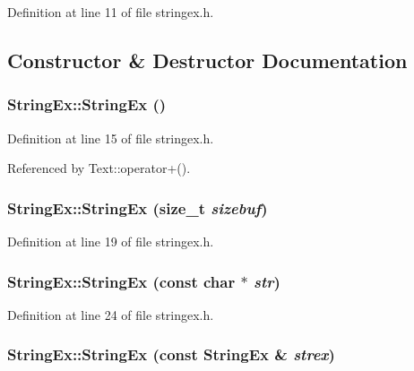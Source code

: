 Definition at line 11 of file stringex.h.

\subsection{Constructor \& Destructor Documentation}
\hypertarget{classStringEx_682cb42c740bb422cc430533b57a92cf}{
\subsubsection[{StringEx}]{\setlength{\rightskip}{0pt plus 5cm}StringEx::StringEx ()}}
\label{classStringEx_682cb42c740bb422cc430533b57a92cf}




Definition at line 15 of file stringex.h.

Referenced by Text::operator+().\hypertarget{classStringEx_949af3bd05202d94d9550fc5da749aba}{
\subsubsection[{StringEx}]{\setlength{\rightskip}{0pt plus 5cm}StringEx::StringEx (size\_\-t {\em sizebuf})}}
\label{classStringEx_949af3bd05202d94d9550fc5da749aba}




Definition at line 19 of file stringex.h.\hypertarget{classStringEx_ae67472656d518a9146209d12494cb1b}{
\subsubsection[{StringEx}]{\setlength{\rightskip}{0pt plus 5cm}StringEx::StringEx (const char $\ast$ {\em str})}}
\label{classStringEx_ae67472656d518a9146209d12494cb1b}




Definition at line 24 of file stringex.h.\hypertarget{classStringEx_93e2a37d36fe9104558e448924fcb57d}{
\subsubsection[{StringEx}]{\setlength{\rightskip}{0pt plus 5cm}StringEx::StringEx (const {\bf StringEx} \& {\em strex})}}
\label{classStringEx_93e2a37d36fe9104558e448924fcb57d}




